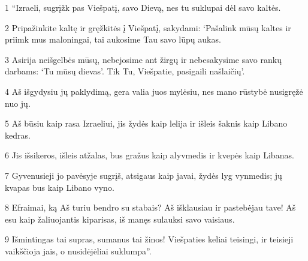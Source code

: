\par 1 “Izraeli, sugrįžk pas Viešpatį, savo Dievą, nes tu suklupai dėl savo kaltės. 
\par 2 Pripažinkite kaltę ir gręžkitės į Viešpatį, sakydami: ‘Pašalink mūsų kaltes ir priimk mus maloningai, tai aukosime Tau savo lūpų aukas. 
\par 3 Asirija neišgelbės mūsų, nebejosime ant žirgų ir nebesakysime savo rankų darbams: ‘Tu mūsų dievas’. Tik Tu, Viešpatie, pasigaili našlaičių’. 
\par 4 Aš išgydysiu jų paklydimą, gera valia juos mylėsiu, nes mano rūstybė nusigręžė nuo jų. 
\par 5 Aš būsiu kaip rasa Izraeliui, jis žydės kaip lelija ir išleis šaknis kaip Libano kedras. 
\par 6 Jis išsikeros, išleis atžalas, bus gražus kaip alyvmedis ir kvepės kaip Libanas. 
\par 7 Gyvenusieji jo pavėsyje sugrįš, atsigaus kaip javai, žydės lyg vynmedis; jų kvapas bus kaip Libano vyno. 
\par 8 Efraimai, ką Aš turiu bendro su stabais? Aš išklausiau ir pastebėjau tave! Aš esu kaip žaliuojantis kiparisas, iš manęs sulauksi savo vaisiaus. 
\par 9 Išmintingas tai supras, sumanus tai žinos! Viešpaties keliai teisingi, ir teisieji vaikščioja jais, o nusidėjėliai suklumpa”.


